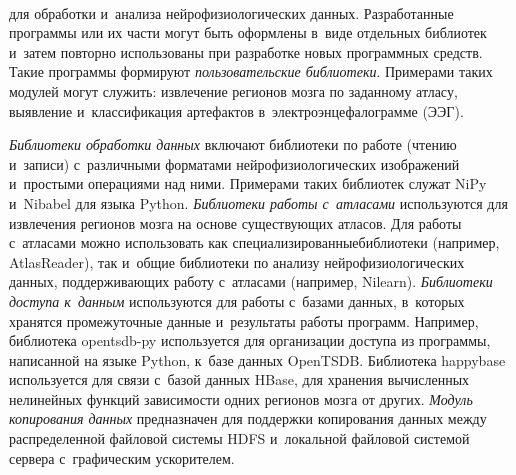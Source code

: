 \begin{figure*} %
\vspace*{1pt}
 \begin{center}
 \mbox{%
 \epsfxsize=161.936mm  
 }
  \end{center}
\vspace*{-6pt}
\end{figure*}

\begin{multicols}{2}

\noindent
 для обработки 
и~анализа нейрофизиологических данных. Разработанные программы или их 
части могут быть оформлены в~виде отдельных биб\-лио\-тек и~затем повторно 
использованы при разработке новых программных средств. Такие программы 
формируют \textit{пользовательские библиотеки}. Примерами таких модулей 
могут служить: извлечение регионов мозга по заданному атласу, выявление 
и~классификация артефактов в~электроэнцефалограмме (ЭЭГ).
    
    \textit{Библиотеки обработки данных} включают биб\-лио\-те\-ки по работе 
(чтению и~записи) с~различными форматами нейрофизиологических 
изображений и~простыми операциями над ними. \mbox{Примерами} таких биб\-лио\-тек 
служат NiPy и~Nibabel для языка Python. \textit{Библиотеки работы 
с~атласами} используются для извлечения регионов мозга на основе\linebreak 
существующих атласов. Для работы с~атласами можно использовать как 
специализированные\linebreak биб\-лио\-те\-ки (например, AtlasReader), так и~\mbox{общие} 
биб\-лио\-те\-ки по анализу нейрофизиологических {данных}, под\-дер\-жи\-ва\-ющих 
работу с~атласами (например, Nilearn). \textit{Библиотеки доступа к~данным} 
используются для работы с~базами данных, в~которых хранятся 
промежуточные данные и~результаты работы программ. Например, 
библиотека \mbox{opentsdb-py} используется для организации доступа из 
программы, написанной на языке Python, к~базе данных OpenTSDB. 
Библиотека \mbox{happybase} используется для связи с~базой данных HBase, для 
хранения вы\-чис\-лен\-ных нелинейных функций за\-ви\-си\-мости одних регионов 
мозга от других. \textit{Модуль копирования данных} предназначен для 
поддержки копирования данных между распределенной файловой сис\-те\-мы 
HDFS и~локальной файловой сис\-те\-мой сервера с~графическим ускорителем.
    

\end{multicols}
